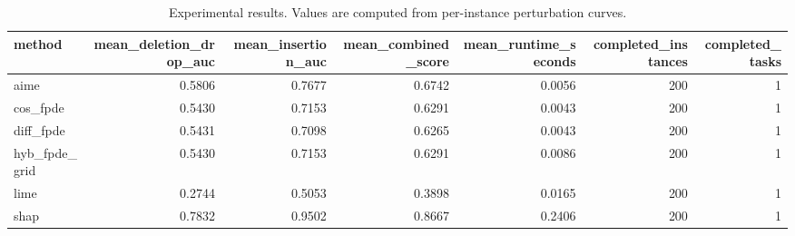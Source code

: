 \begin{table}[t]
\caption{Experimental results. Values are computed from per-instance perturbation curves.}
\label{tab:main_results_computed}
\centering
\begin{tabular}{lrrrrrr}
\toprule
method & mean\_deletion\_drop\_auc & mean\_insertion\_auc & mean\_combined\_score & mean\_runtime\_seconds & completed\_instances & completed\_tasks \\
\midrule
aime & 0.5806 & 0.7677 & 0.6742 & 0.0056 & 200 & 1 \\
cos\_fpde & 0.5430 & 0.7153 & 0.6291 & 0.0043 & 200 & 1 \\
diff\_fpde & 0.5431 & 0.7098 & 0.6265 & 0.0043 & 200 & 1 \\
hyb\_fpde\_grid & 0.5430 & 0.7153 & 0.6291 & 0.0086 & 200 & 1 \\
lime & 0.2744 & 0.5053 & 0.3898 & 0.0165 & 200 & 1 \\
shap & 0.7832 & 0.9502 & 0.8667 & 0.2406 & 200 & 1 \\
\bottomrule
\end{tabular}

\end{table}
